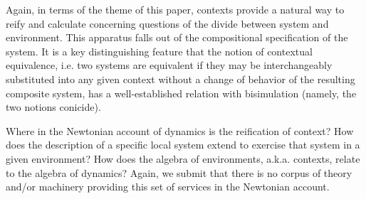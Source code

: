 Again, in terms of the theme of this paper, contexts provide a natural
way to reify and calculate concerning questions of the divide between
system and environment. This apparatus falls out of the compositional
specification of the system. It is a key distinguishing feature that
the notion of contextual equivalence, i.e. two systems are equivalent
if they may be interchangeably substituted into any given context
without a change of behavior of the resulting composite system, has a
well-established relation with bisimulation (namely, the two notions
conicide).

Where in the Newtonian account of dynamics is the reification of
context? How does the description of a specific local system extend to
exercise that system in a given environment? How does the algebra of
environments, a.k.a. contexts, relate to the algebra of dynamics?
Again, we submit that there is no corpus of theory and/or machinery
providing this set of services in the Newtonian account.
